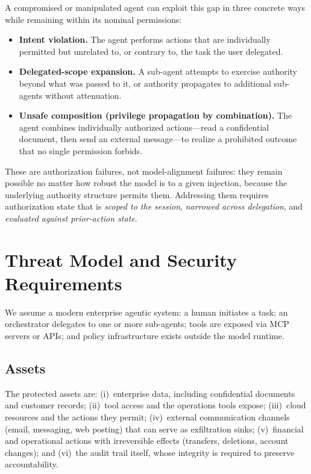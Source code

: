 \documentclass[sigconf,nonacm]{acmart}
\begin{document}
A compromised or manipulated agent can exploit this gap in three concrete ways while remaining within its nominal permissions:
\begin{itemize}
\item \textbf{Intent violation.} The agent performs actions that are individually permitted but unrelated to, or contrary to, the task the user delegated.
\item \textbf{Delegated-scope expansion.} A sub-agent attempts to exercise authority beyond what was passed to it, or authority propagates to additional sub-agents without attenuation.
\item \textbf{Unsafe composition (privilege propagation by combination).} The agent combines individually authorized actions---read a confidential document, then send an external message---to realize a prohibited outcome that no single permission forbids.
\end{itemize}

These are authorization failures, not model-alignment failures: they remain possible no matter how robust the model is to a given injection, because the underlying authority structure permits them. Addressing them requires authorization state that is \emph{scoped to the session}, \emph{narrowed across delegation}, and \emph{evaluated against prior-action state}.

\section{Threat Model and Security Requirements}\label{sec:threat}

We assume a modern enterprise agentic system: a human initiates a task; an orchestrator delegates to one or more sub-agents; tools are exposed via MCP servers or APIs; and policy infrastructure exists outside the model runtime.

\subsection{Assets}

The protected assets are: (i)~enterprise data, including confidential documents and customer records; (ii)~tool access and the operations tools expose; (iii)~cloud resources and the actions they permit; (iv)~external communication channels (email, messaging, web posting) that can serve as exfiltration sinks; (v)~financial and operational actions with irreversible effects (transfers, deletions, account changes); and (vi)~the audit trail itself, whose integrity is required to preserve accountability.
\end{document}
